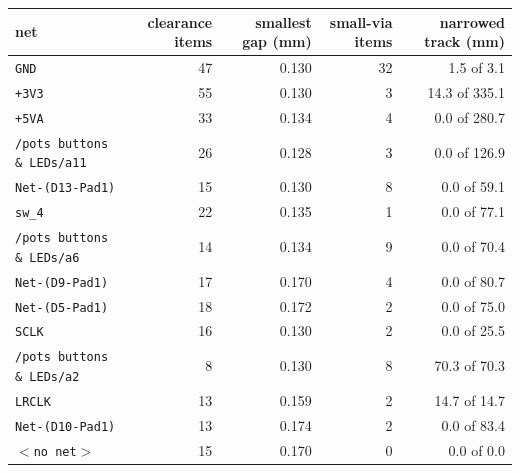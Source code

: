 \begin{tabular}{lrrrr}
\toprule
net & clearance items & smallest gap (mm) & small-via items & narrowed track (mm) \\
\midrule
\texttt{GND} & 47 & 0.130 & 32 & 1.5 of 3.1 \\
\texttt{+3V3} & 55 & 0.130 & 3 & 14.3 of 335.1 \\
\texttt{+5VA} & 33 & 0.134 & 4 & 0.0 of 280.7 \\
\texttt{/pots buttons \& LEDs/a11} & 26 & 0.128 & 3 & 0.0 of 126.9 \\
\texttt{Net-(D13-Pad1)} & 15 & 0.130 & 8 & 0.0 of 59.1 \\
\texttt{sw\_4} & 22 & 0.135 & 1 & 0.0 of 77.1 \\
\texttt{/pots buttons \& LEDs/a6} & 14 & 0.134 & 9 & 0.0 of 70.4 \\
\texttt{Net-(D9-Pad1)} & 17 & 0.170 & 4 & 0.0 of 80.7 \\
\texttt{Net-(D5-Pad1)} & 18 & 0.172 & 2 & 0.0 of 75.0 \\
\texttt{SCLK} & 16 & 0.130 & 2 & 0.0 of 25.5 \\
\texttt{/pots buttons \& LEDs/a2} & 8 & 0.130 & 8 & 70.3 of 70.3 \\
\texttt{LRCLK} & 13 & 0.159 & 2 & 14.7 of 14.7 \\
\texttt{Net-(D10-Pad1)} & 13 & 0.174 & 2 & 0.0 of 83.4 \\
\texttt{$<$no net$>$} & 15 & 0.170 & 0 & 0.0 of 0.0 \\
\bottomrule
\end{tabular}
